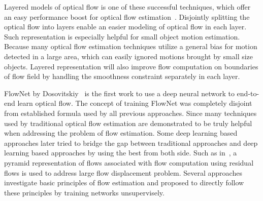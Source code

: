 \documentclass[10pt,twocolumn,letterpaper]{article}
\begin{document}
Layered models of optical flow is one of these successful techniques, which offer an easy performance boost for optical flow estimation~\cite{wang1994representing}\cite{341161}\cite{darrell1995cooperative}. Disjointly splitting the optical flow into layers enable an easier modeling of optical flow in each layer. Such representation is especially helpful for small object motion estimation. Because many optical flow estimation techniques utilize a general bias for motion detected in a large area, which can easily ignored motions brought by small size objects. Layered representation will also improve flow computation on boundaries of flow field by handling the smoothness constraint separately in each layer.

FlowNet by Dosovitskiy~\cite{7410673} is the first work to use a deep neural network to end-to-end learn optical flow. The concept of training FlowNet was completely disjoint from established formula used by all previous approaches. Since many techniques used by traditional optical flow estimation are demonstrated to be truly helpful when addressing the problem of flow estimation.  Some deep learning based approaches later tried to bridge the gap between traditional approaches and deep learning based approaches by using the best from both side. Such as in~\cite{Ranjan_2017_CVPR}, a pyramid representation of flows associated with flow computation using residual flows is used to address large flow displacement problem. Several approaches~\cite{ren2017unsupervised}\cite{ahmadi2016unsupervised}\cite{DBLP:journals/corr/YuHD16} investigate basic principles of flow estimation and proposed to directly follow these principles by training networks unsupervisely.   
\end{document}
